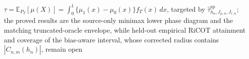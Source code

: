 \(\tau=\mathbb E_{P_T}[\mu(X)]=\int_0^1\{\mu_1(x)-\mu_0(x)\}f_T(x)\,dx\), targeted by \(\widehat\tau^{\mathrm{sp}}_{h_n,J_{\mu,n},J_{r,n}}\); the proved results are the source-only minimax lower phase diagram and the matching truncated-oracle envelope, while held-out empirical RiCOT attainment and coverage of the bias-aware interval, whose corrected radius contains \(|C_{n,m}(h_n)|\), remain open